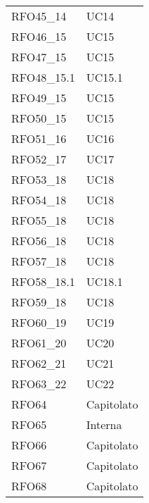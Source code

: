 \begin{longtable}{C{6cm} C{3cm}}
    RFO45\_14 & UC14 \\
    
    RFO46\_15 & UC15 \\
    
    RFO47\_15 & UC15 \\
    
    RFO48\_15.1 & UC15.1 \\
    
    RFO49\_15 & UC15 \\
    
    RFO50\_15 & UC15 \\
    
    RFO51\_16 & UC16 \\
    
    RFO52\_17 & UC17 \\
    
    RFO53\_18 & UC18 \\
    
    RFO54\_18 & UC18 \\
    
    RFO55\_18 & UC18 \\
    
    RFO56\_18 & UC18 \\
    
    RFO57\_18 & UC18 \\
    
    RFO58\_18.1 & UC18.1 \\
    
    RFO59\_18 & UC18 \\
    
    RFO60\_19 & UC19 \\
    
    RFO61\_20 & UC20 \\
    
    RFO62\_21 & UC21 \\
    
    RFO63\_22 & UC22 \\

    RFO64 & Capitolato \\
    
    RFO65 & Interna \\
    
    RFO66 & Capitolato \\
    
    RFO67 & Capitolato \\
        
    RFO68 & Capitolato \\
    

\end{longtable}
